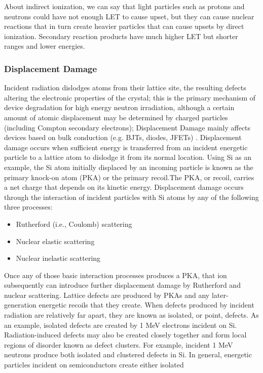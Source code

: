 \documentclass[./dissertation.tex]{subfiles}
\begin{document}
About indirect ionization, we can say that light particles such as protons and neutrons
could have not enough LET to cause upset, but they can cause nuclear reactions that
in turn create heavier particles that can cause upsets by direct ionization. Secondary
reaction products have much higher LET but shorter ranges and lower energies\cite{bib9}.
\subsubsection{Displacement Damage}
Incident radiation dislodges atoms from their lattice site, the resulting defects altering the electronic properties of the crystal; this is the primary mechanism of device
degradation for high energy neutron irradiation, although a certain amount of atomic
displacement may be determined by charged particles (including Compton secondary
electrons); Displacement Damage mainly affects devices based on bulk conduction
(e.g. BJTs, diodes, JFETs) \cite{bib1}. Displacement damage occurs when sufficient energy
is transferred from an incident energetic particle to a lattice atom to dislodge it from
its normal location. Using Si as an example, the Si atom initially displaced by an
incoming particle is known as the primary knock-on atom (PKA) or the primary recoil.The PKA, or recoil, carries a net charge that depends on its kinetic energy.
Displacement damage occurs through the interaction of incident particles with Si
atoms by any of the following three processes:
\begin{itemize}
\item Rutherford (i.e., Coulomb) scattering
\item Nuclear elastic scattering
\item Nuclear inelastic scattering
\end{itemize}
Once any of those basic interaction processes produces a PKA, that ion subsequently
can introduce further displacement damage by Rutherford and nuclear scattering.
Lattice defects are produced by PKAs and any later-generation energetic recoils that
they create. When defects produced by incident radiation are relatively far apart,
they are known as isolated, or point, defects. As an example, isolated defects are
created by 1 MeV electrons incident on Si. Radiation-induced defects may also be
created closely together and form local regions of disorder known as defect clusters.
For example, incident 1 MeV neutrons produce both isolated and clustered defects in
Si. In general, energetic particles incident on semiconductors create either isolated
\end{document}
